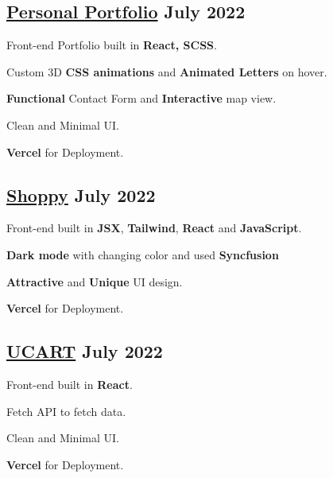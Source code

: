 \subsection{{\href{https://nidhikumari.vercel.app/}{Personal Portfolio} \hfill July 2022}}
\begin{zitemize}
\item Front-end Portfolio built in \textbf{React, SCSS}.
\item Custom 3D \textbf{ CSS animations } and \textbf{Animated Letters }on hover.
\item \textbf{Functional} Contact Form and \textbf{Interactive} map view.
\item Clean and Minimal UI.
\item \textbf{Vercel} for Deployment.
\end{zitemize}

\subsection{{\href{https://shoppy-brown.vercel.app/}{Shoppy} \hfill July 2022}}
\begin{zitemize}
\item Front-end built in \textbf{JSX}, \textbf{Tailwind}, \textbf{React} and \textbf{JavaScript}.
\item \textbf{Dark mode} with changing color and used \textbf{Syncfusion} 
\item \textbf{Attractive} and \textbf{Unique} UI design.
\item \textbf{Vercel} for Deployment.
\end{zitemize}


\subsection{{\href{https://cart-topaz.vercel.app/}{UCART} \hfill July 2022}}
\begin{zitemize}
\item Front-end built in \textbf{React}.
\item Fetch API to fetch data.
\item Clean and Minimal UI.
\item \textbf{Vercel} for Deployment.
\end{zitemize}


